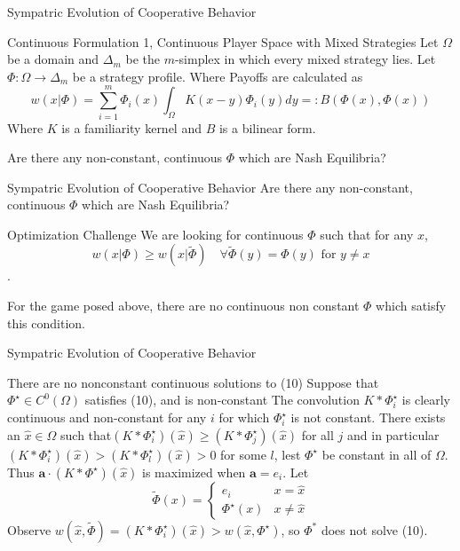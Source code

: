 \documentclass{beamer}
\begin{document}
\begin{frame}{Sympatric Evolution of Cooperative Behavior}
	\begin{block}{Continuous Formulation 1, Continuous Player Space with Mixed Strategies}
		Let $\Omega$ be a domain and $\Delta_m$ be the $m$-simplex in which every mixed strategy lies. Let $\Phi:\Omega \rightarrow\Delta_m$ be a strategy profile. Where Payoffs are calculated as 
		\begin{equation}
			w(x|\Phi)=\sum_{i=1}^m \Phi_i(x)\int_\Omega K(x-y)\Phi_i(y)dy =:B(\Phi(x),\Phi(x)) 
		\end{equation} 
		Where $K$ is a familiarity kernel and $B$ is a bilinear form. 
	\end{block}
	Are there any non-constant, continuous $\Phi$ which are Nash Equilibria? 
\end{frame}

\begin{frame}{Sympatric Evolution of Cooperative Behavior}
	Are there any non-constant, continuous $\Phi$ which are Nash Equilibria?
	\begin{block}{Optimization Challenge}
		We are looking for continuous $\Phi$ such that for any $x$,
		\begin{equation}
			w(x|\Phi)\geq w(x|\tilde\Phi)\quad \forall \tilde \Phi(y) = \Phi (y) \text{ for } y\neq x
		\end{equation}. 
	\end{block}

	For the game posed above, there are no continuous non constant $\Phi$ which satisfy this condition. 
\end{frame}

\begin{frame}{Sympatric Evolution of Cooperative Behavior}
	\begin{block}{There are no nonconstant continuous solutions to (10)}
		Suppose that $\Phi^\star\in C^0(\Omega)$ satisfies (10), and is non-constant 
		The convolution $K*\Phi^\star_i$ is clearly continuous and  non-constant for any $i$ for which $\Phi^\star_i$ is not constant.  There exists an $\hat x\in \Omega$ such that$(K*\Phi^\star_i)(\hat x)\geq(K*\Phi^\star_j)(\hat x)$ for all $j$ and in particular $(K*\Phi^\star_i)(\hat x)>(K*\Phi^\star_l)(\hat x)>0$ for some $l$, lest $\Phi^\star$ be constant in all of $\Omega$. Thus $\mathbf{a}\cdot (K*\Phi^\star)(\hat x)$ is maximized when $\mathbf{a}=e_i$. Let  \begin{equation}\tilde{\Phi}(x)=\begin{cases} e_i&x=\hat x\\
				\Phi^\star(x)&x\neq \hat x \end{cases}
		\end{equation}
	Observe  $w(\hat x, \tilde{\Phi})=(K*\Phi_i^\star)(\hat x)>w(\hat x, \Phi^\star)$, so $\Phi^*$ does not solve (10).
	\end{block}
\end{frame}
	
\end{document}
